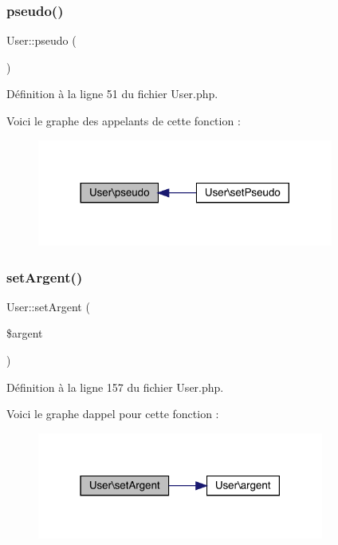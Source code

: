 \subsubsection{\texorpdfstring{pseudo()}{pseudo()}}
{\footnotesize\ttfamily User\+::pseudo (\begin{DoxyParamCaption}{ }\end{DoxyParamCaption})}



Définition à la ligne 51 du fichier User.\+php.

Voici le graphe des appelants de cette fonction \+:\nopagebreak
\begin{figure}[H]
\begin{center}
\leavevmode
\includegraphics[width=276pt]{class_user_a5589abfe412eaa4755f3c984729802b7_icgraph}
\end{center}
\end{figure}
\mbox{\label{class_user_a1ec02d8692a7b6ae5e191f83c8e81659}} 
\subsubsection{\texorpdfstring{set\+Argent()}{setArgent()}}
{\footnotesize\ttfamily User\+::set\+Argent (\begin{DoxyParamCaption}\item[{}]{\$argent }\end{DoxyParamCaption})}



Définition à la ligne 157 du fichier User.\+php.

Voici le graphe d\textquotesingle{}appel pour cette fonction \+:\nopagebreak
\begin{figure}[H]
\begin{center}
\leavevmode
\includegraphics[width=267pt]{class_user_a1ec02d8692a7b6ae5e191f83c8e81659_cgraph}
\end{center}
\end{figure}
\mbox{\label{class_user_a018ae17e436e09134922835cdd3235a7}} 
